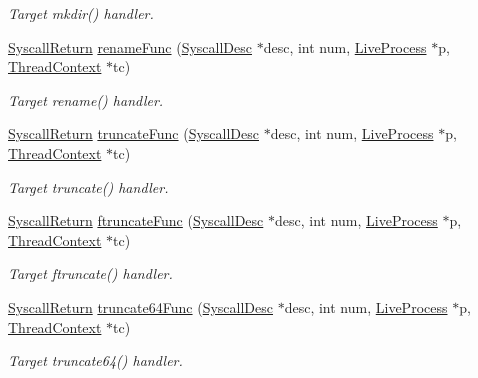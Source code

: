 \begin{DoxyCompactItemize}
\begin{DoxyCompactList}\small\item\em Target mkdir() handler. \item\end{DoxyCompactList}\item 
\hyperlink{classSyscallReturn}{SyscallReturn} \hyperlink{syscall__emul_8hh_a7a4679edd20bcb6c6095d9641bf60a41}{renameFunc} (\hyperlink{classSyscallDesc}{SyscallDesc} $\ast$desc, int num, \hyperlink{classLiveProcess}{LiveProcess} $\ast$p, \hyperlink{classThreadContext}{ThreadContext} $\ast$tc)
\begin{DoxyCompactList}\small\item\em Target rename() handler. \item\end{DoxyCompactList}\item 
\hyperlink{classSyscallReturn}{SyscallReturn} \hyperlink{syscall__emul_8hh_a6e21e57c806344e2ecbb7d2c952af5f9}{truncateFunc} (\hyperlink{classSyscallDesc}{SyscallDesc} $\ast$desc, int num, \hyperlink{classLiveProcess}{LiveProcess} $\ast$p, \hyperlink{classThreadContext}{ThreadContext} $\ast$tc)
\begin{DoxyCompactList}\small\item\em Target truncate() handler. \item\end{DoxyCompactList}\item 
\hyperlink{classSyscallReturn}{SyscallReturn} \hyperlink{syscall__emul_8hh_a895fc73a0e8bb8bbb33b4683a8c5cdf9}{ftruncateFunc} (\hyperlink{classSyscallDesc}{SyscallDesc} $\ast$desc, int num, \hyperlink{classLiveProcess}{LiveProcess} $\ast$p, \hyperlink{classThreadContext}{ThreadContext} $\ast$tc)
\begin{DoxyCompactList}\small\item\em Target ftruncate() handler. \item\end{DoxyCompactList}\item 
\hyperlink{classSyscallReturn}{SyscallReturn} \hyperlink{syscall__emul_8hh_ae8fe2ae6e9a7f93b2fec78dd445ee0bd}{truncate64Func} (\hyperlink{classSyscallDesc}{SyscallDesc} $\ast$desc, int num, \hyperlink{classLiveProcess}{LiveProcess} $\ast$p, \hyperlink{classThreadContext}{ThreadContext} $\ast$tc)
\begin{DoxyCompactList}\small\item\em Target truncate64() handler. \item\end{DoxyCompactList}\item 

\end{DoxyCompactItemize}
